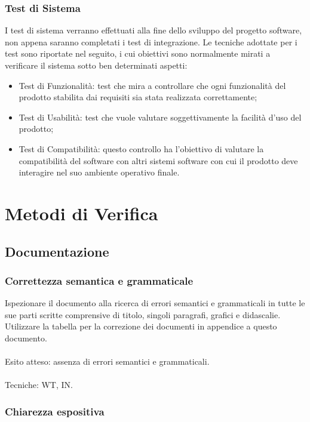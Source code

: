\subsubsection*{Test di Sistema} 
I test di sistema verranno effettuati alla fine
dello sviluppo del progetto software, non appena saranno completati i test di
integrazione. Le tecniche adottate per i test sono
riportate nel seguito, i cui obiettivi sono normalmente mirati a verificare il
sistema sotto ben determinati aspetti:
\begin{itemize}
  \item Test di Funzionalit\`a: test che mira a controllare che ogni
  funzionalit\`a del prodotto stabilita dai requisiti sia stata realizzata
  correttamente;
\item Test di Usabilit\`a: test che vuole valutare soggettivamente la facilit\`a
d'uso del prodotto;
\item Test di Compatibilit\`a: questo controllo ha l'obiettivo di valutare la
compatibilit\`a del software con altri sistemi software con cui il prodotto deve
interagire nel suo ambiente operativo finale.
\end{itemize}

\section{Metodi di Verifica}

\subsection{Documentazione}

\subsubsection*{Correttezza semantica e grammaticale}

Ispezionare il documento alla ricerca di errori semantici e grammaticali in
tutte le sue parti scritte comprensive di titolo, singoli paragrafi, grafici e didascalie.
Utilizzare la tabella per la correzione dei documenti in appendice a questo
documento.
\\\\
Esito atteso: assenza di errori semantici e grammaticali.
\\\\
Tecniche: WT, IN.

\subsubsection*{Chiarezza espositiva}

